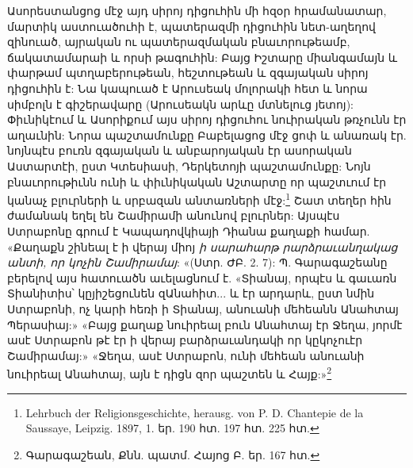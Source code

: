\documentclass{article}
\begin{document}
{Ասորեստանցոց մէջ այդ սիրոյ դիցուհին մի հզօր հրամանատար, մարտիկ աստուածուհի է, պատերազմի դիցուհին նետ-աղեղով զինուած, այրական ու պատերազմական բնաւորութեամբ, ճակատամարաի և որսի թագուհին: Բայց Իշտարը միանգամայն և փարթամ պտղաբերութեան, հեշտութեան և զգայական սիրոյ դիցուհին է: Նա կապուած է Արուսեակ մոլորակի հետ և նորա սիմբոլն է գիշերավարը (Արուսեակն արևը մտնելուց յետոյ): Փիւնիկէում և Ասորիքում այս սիրոյ դիցուհու նուիրական թռչունն էր աղաւնին: Նորա պաշտամունքը Բաբելացոց մէջ ցոփ և անառակ էր. նոյնպէս բուռն զգայական և անբարոյական էր ասորական Աստարտէի, ըստ Կտեսիասի, Դերկետոյի պաշտամունքը: Նոյն բնաւորութիւնն ունի և փիւնիկական Աշտարտը որ պաշտւում էր կանաչ բլուրների և սրբազան անտառների մէջ:\footnote{Lehrbuch der Religionsgeschichte, herausg. von P. D. Chantepie de la Saussaye, Leipzig. 1897, 1. եր. 190 հտ. 197 հտ. 225 հտ.} Շատ տեղեր հին ժամանակ եղել են Շամիրամի անունով բլուրներ: Այսպէս Ստրաբոնը գրում է Կապադովկիայի Դիանա քաղաքի համար. «Քաղաքն շինեալ է ի վերայ միոյ \emph{ի սարահարթ րարձրաւանղակաց անտի, որ կոչին Շամիրամայ}: «(Ստր. ԺԲ. 2. 7): Պ. Գարագաշեանը բերելով այս հատուածն աւելացնում է. «Տիանայ, որպէս և գաւառն Տիանիտիս՝ կըյիշեցունեն զԱնահիտ... և էր արդարև, ըստ նմին Ստրաբոնի, ոչ կարի հեռի ի Տիանայ, անուանի մեհեանն Անահտայ Պերասիայ:» «Բայց քաղաք նուիրեալ բուն Անահտայ էր Ջեղա, յորմէ ասէ Ստրաբոն թէ էր ի վերայ բարձրաւանդակի որ կըկոչուէր Շամիրամայ:» «Ջեղա, ասէ Ստրաբոն, ունի մեհեան անուանի նուիրեալ Անահտայ, այն է դիցն զոր պաշտեն և Հայք:»\footnote{Գարագաշեան, Քնն. պատմ. Հայոց Բ. եր. 167 հտ.}

}
\end{document}
